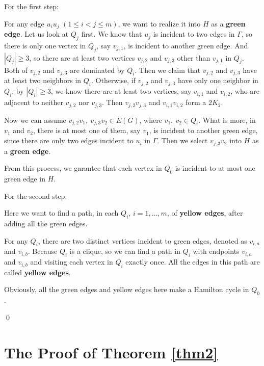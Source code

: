 \documentclass[12pt]{article}
\begin{document}
For the first step:

For any edge $u_iu_j$ $(1\le i<j\le m)$, we want to realize it into $H$ as a {\bf green edge}. Let us look at $Q_j$ first. We know that $u_j$ is incident to two edges in $\Gamma$, so there is only one vertex in $Q_j$, say $v_{j,1}$, is incident to another green edge. And $|Q_j|\ge3$, so there are at least two vertices $v_{j,2}$ and $v_{j,3}$ other than $v_{j,1}$ in $Q_j$. Both of $v_{j,2}$ and $v_{j,3}$ are dominated by $Q_i$. Then we claim that $v_{j,2}$ and $v_{j,3}$ have at least two neighbors in $Q_i$. Otherwise, if $v_{j,2}$ and $v_{j,3}$ have only one neighbor in $Q_i$, by $|Q_i|\ge3$, we know there are at least two vertices, say $v_{i,1}$ and $v_{i,2}$, who are adjacent to neither $v_{j,2}$ nor $v_{j,3}$. Then $v_{j,2}v_{j,3}$ and $v_{i,1}v_{i,2}$ form a $2K_2$.

Now we can assume $v_{j,2}v_1,~v_{j,3}v_2\in E(G)$, where $v_1,~v_2\in Q_i$. What is more, in $v_1$ and $v_2$, there is at most one of them, say $v_1$, is incident to another green edge, since there are only two edges incident to $u_i$ in $\Gamma$. Then we select $v_{j,3}v_2$ into $H$ as a {\bf green edge}.

From this process, we garantee that each vertex in $Q_0$ is incident to at most one green edge in $H$.

For the second step:

Here we want to find a path, in each $Q_i$, $i=1,\dots,m$, of {\bf yellow edges}, after adding all the green edges.

For any $Q_i$, there are two distinct vertices incident to green edges, denoted as $v_{i,a}$ and $v_{i,b}$. Because $Q_i$ is a clique, so we can find a path in $Q_i$ with endpoints $v_{i,a}$ and $v_{i,b}$ and visiting each vertex in $Q_i$ exactly once. All the edges in this path are called {\bf yellow edges}.

Obviously, all the green edges and yellow edges here make a Hamilton cycle in $Q_0$.








\qed












\section{The Proof of Theorem \ref{thm2}}
\end{document}
